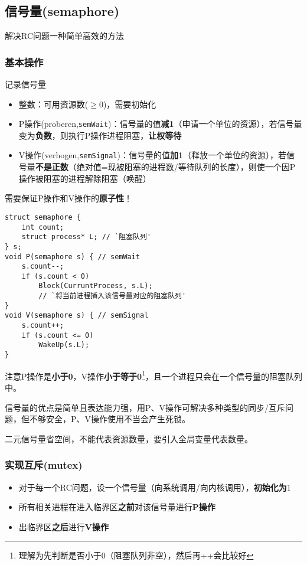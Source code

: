 \subsection{信号量(semaphore)}
解决RC问题一种简单高效的方法

\subsubsection{基本操作}
记录信号量
\begin{itemize}
    \item 整数：可用资源数($\geq 0$)，需要初始化
    \item P操作(proberen,\verb'semWait')：信号量的值\textbf{减1}（申请一个单位的资源），若信号量变为\textbf{负数}，则执行P操作进程阻塞，\textbf{让权等待}
    \item V操作(verhogen,\verb'semSignal')：信号量的值\textbf{加1}（释放一个单位的资源），若信号量\textbf{不是正数}（绝对值=现被阻塞的进程数/等待队列的长度），则使一个因P操作被阻塞的进程解除阻塞（唤醒）
\end{itemize}
需要保证P操作和V操作的\textbf{原子性}！
\begin{lstlisting}
struct semaphore {
    int count;
    struct process* L; // `阻塞队列'
} s;
void P(semaphore s) { // semWait
    s.count--;
    if (s.count < 0)
        Block(CurruntProcess, s.L);
        // `将当前进程插入该信号量对应的阻塞队列'
}
void V(semaphore s) { // semSignal
    s.count++;
    if (s.count <= 0)
        WakeUp(s.L);
}
\end{lstlisting}
注意P操作是\textbf{小于0}，V操作\textbf{小于等于0}\footnote{理解为先判断是否小于0（阻塞队列非空），然后再++会比较好}，且一个进程只会在一个信号量的阻塞队列中。

信号量的优点是简单且表达能力强，用P、V操作可解决多种类型的同步/互斥问题，但不够安全，P、V操作使用不当会产生死锁。

二元信号量省空间，不能代表资源数量，要引入全局变量代表数量。

\subsubsection{实现互斥(mutex)}
\begin{itemize}
    \item 对于每一个RC问题，设一个信号量（向系统调用/向内核调用），\textbf{初始化为$1$}
    \item 所有相关进程在进入临界区\textbf{之前}对该信号量进行\textbf{P操作}
    \item 出临界区\textbf{之后}进行\textbf{V操作}
\end{itemize}

